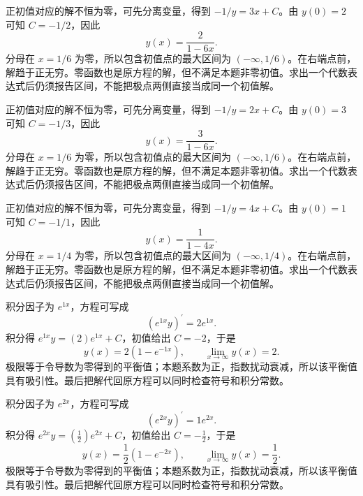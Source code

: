\documentclass[UTF8,12pt,a4paper,fontset=fandol]{ctexart}
\begin{document}
\begin{solve}\label{ans:c22q10}
正初值对应的解不恒为零，可先分离变量，得到 $-1/y=3x+C$。由 $y(0)=2$ 可知 $C=-1/2$，因此
\[
y(x)=\frac{2}{1-6x}.
\]
分母在 $x=1/6$ 为零，所以包含初值点的最大区间为 $(-\infty,1/6)$。在右端点前，解趋于正无穷。零函数也是原方程的解，但不满足本题非零初值。求出一个代数表达式后仍须报告区间，不能把极点两侧直接当成同一个初值解。
\end{solve}

\begin{solve}\label{ans:c22q11}
正初值对应的解不恒为零，可先分离变量，得到 $-1/y=2x+C$。由 $y(0)=3$ 可知 $C=-1/3$，因此
\[
y(x)=\frac{3}{1-6x}.
\]
分母在 $x=1/6$ 为零，所以包含初值点的最大区间为 $(-\infty,1/6)$。在右端点前，解趋于正无穷。零函数也是原方程的解，但不满足本题非零初值。求出一个代数表达式后仍须报告区间，不能把极点两侧直接当成同一个初值解。
\end{solve}

\begin{solve}\label{ans:c22q12}
正初值对应的解不恒为零，可先分离变量，得到 $-1/y=4x+C$。由 $y(0)=1$ 可知 $C=-1/1$，因此
\[
y(x)=\frac{1}{1-4x}.
\]
分母在 $x=1/4$ 为零，所以包含初值点的最大区间为 $(-\infty,1/4)$。在右端点前，解趋于正无穷。零函数也是原方程的解，但不满足本题非零初值。求出一个代数表达式后仍须报告区间，不能把极点两侧直接当成同一个初值解。
\end{solve}

\begin{solve}\label{ans:c22q13}
积分因子为 $e^{1x}$，方程可写成
\[
\left(e^{1x}y\right)^{\prime}=2e^{1x}.
\]
积分得 $e^{1x}y=(2)e^{1x}+C$，初值给出 $C=-2$，于是
\[
y(x)=2(1-e^{-1x}),\qquad\lim_{x\to\infty}y(x)=2.
\]
极限等于令导数为零得到的平衡值；本题系数为正，指数扰动衰减，所以该平衡值具有吸引性。最后把解代回原方程可以同时检查符号和积分常数。
\end{solve}

\begin{solve}\label{ans:c22q14}
积分因子为 $e^{2x}$，方程可写成
\[
\left(e^{2x}y\right)^{\prime}=1e^{2x}.
\]
积分得 $e^{2x}y=(\frac{1}{2})e^{2x}+C$，初值给出 $C=-\frac{1}{2}$，于是
\[
y(x)=\frac{1}{2}(1-e^{-2x}),\qquad\lim_{x\to\infty}y(x)=\frac{1}{2}.
\]
极限等于令导数为零得到的平衡值；本题系数为正，指数扰动衰减，所以该平衡值具有吸引性。最后把解代回原方程可以同时检查符号和积分常数。
\end{solve}
\end{document}
